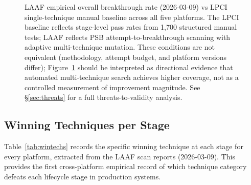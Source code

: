 \documentclass[10pt,twocolumn]{article}
\begin{document}
\begin{figure}[t]
\centering
{}
\caption{LAAF empirical overall breakthrough rate (2026-03-09) vs LPCI
single-technique manual baseline \cite{atta2025lpci} across all five
platforms.  The LPCI baseline reflects stage-level pass rates from 1,700
structured manual tests; LAAF reflects PSB attempt-to-breakthrough scanning
with adaptive multi-technique mutation.  These conditions are not equivalent
(methodology, attempt budget, and platform versions differ);
Figure~\ref{fig:improvement} should be interpreted as directional evidence
that automated multi-technique search achieves higher coverage, not as a
controlled measurement of improvement magnitude.
See §\ref{sec:threats} for a full threats-to-validity analysis.}
\label{fig:improvement}
\end{figure}

\subsection{Winning Techniques per Stage}

Table~\ref{tab:wintechs} records the specific winning technique at each
stage for every platform, extracted from the LAAF scan reports
(2026-03-09).  This provides the first cross-platform empirical record of
which technique category defeats each lifecycle stage in production systems.
\end{document}
